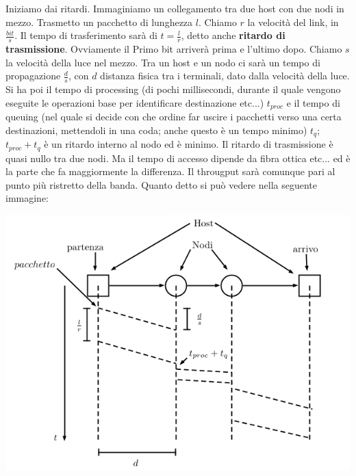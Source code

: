 \documentclass[a4paper,12pt, oneside]{book}
\begin{document}
Iniziamo dai ritardi. Immaginiamo un collegamento tra due host con due nodi in mezzo. Trasmetto un pacchetto di lunghezza $l$. Chiamo $r$ la velocità del link, in $\frac{bit}{s}$. Il tempo di trasferimento sarà di $t=\frac{l}{r}$, detto anche \textbf{ritardo di trasmissione}. Ovviamente il Primo bit arriverà prima e l'ultimo dopo. Chiamo $s$ la velocità della luce nel mezzo. Tra un  host e un nodo ci sarà un tempo di propagazione $\frac{d}{s}$, con $d$ distanza fisica tra i terminali, dato dalla velocità della luce. Si ha poi il tempo di processing (di pochi millisecondi, durante il quale vengono eseguite le operazioni base per identificare destinazione etc...) $t_{proc}$ e il tempo di queuing (nel quale si decide con che ordine far uscire i pacchetti verso una certa destinazioni, mettendoli in una coda; anche questo è un tempo minimo) $t_q$; $t_{proc}+t_q$ è un ritardo interno al nodo ed è minimo. Il ritardo di trasmissione è quasi nullo tra due nodi. Ma il tempo di accesso dipende da fibra ottica etc... ed è la parte che fa maggiormente la differenza. Il througput sarà comunque pari al punto più ristretto della banda.
Quanto detto si può vedere nella seguente immagine:
\begin{center}
\includegraphics[scale=0.5]{img/reti.png}
\end{center}
\end{document}
